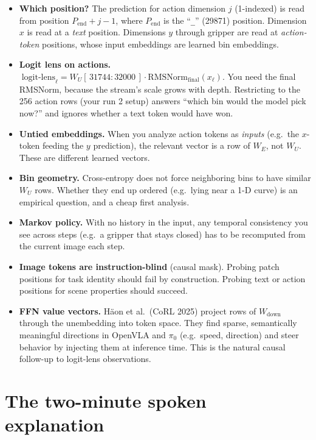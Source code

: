 \documentclass[11pt]{article}
\begin{document}
\begin{interp}
\begin{itemize}
  \item \textbf{Which position?} The prediction for action dimension $j$ (1-indexed) is read from position $P_{\text{end}}+j-1$, where $P_{\text{end}}$ is the ``\texttt{\_}'' (29871) position. Dimension $x$ is read at a \emph{text} position. Dimensions $y$ through gripper are read at \emph{action-token} positions, whose input embeddings are learned bin embeddings.
  \item \textbf{Logit lens on actions.} $\;\text{logit-lens}_\ell = W_U[\,31744{:}32000\,]\cdot\mathrm{RMSNorm}_{\text{final}}(x_\ell)$. You need the final RMSNorm, because the stream's scale grows with depth. Restricting to the 256 action rows (your run 2 setup) answers ``which bin would the model pick now?'' and ignores whether a text token would have won.
  \item \textbf{Untied embeddings.} When you analyze action tokens as \emph{inputs} (e.g.\ the $x$-token feeding the $y$ prediction), the relevant vector is a row of $W_E$, not $W_U$. These are different learned vectors.
  \item \textbf{Bin geometry.} Cross-entropy does not force neighboring bins to have similar $W_U$ rows. Whether they end up ordered (e.g.\ lying near a 1-D curve) is an empirical question, and a cheap first analysis.
  \item \textbf{Markov policy.} With no history in the input, any temporal consistency you see across steps (e.g.\ a gripper that stays closed) has to be recomputed from the current image each step.
  \item \textbf{Image tokens are instruction-blind} (causal mask). Probing patch positions for task identity should fail by construction. Probing text or action positions for scene properties should succeed.
  \item \textbf{FFN value vectors.} Häon et al.\ (CoRL 2025) \cite{haon2025steering} project rows of $W_{\text{down}}$ through the unembedding into token space. They find sparse, semantically meaningful directions in OpenVLA and $\pi_0$ (e.g.\ speed, direction) and steer behavior by injecting them at inference time. This is the natural causal follow-up to logit-lens observations.
\end{itemize}
\end{interp}

\section{The two-minute spoken explanation}
\end{document}
